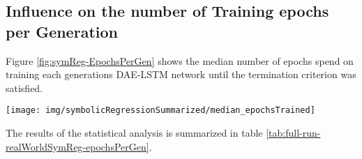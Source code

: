 \documentclass[
  11pt,
]{article}
\let\origfigure\figure
\let\endorigfigure\endfigure
\renewenvironment{figure}[1][2] {
    \expandafter\origfigure\expandafter[H]
} {
    \endorigfigure
}
\begin{document}
\hypertarget{influence-on-the-number-of-training-epochs-per-generation}{%
\subsection{Influence on the number of Training epochs per Generation}\label{influence-on-the-number-of-training-epochs-per-generation}}

Figure \ref{fig:symReg-EpochsPerGen} shows the median number of epochs spend on training each generations DAE-LSTM network until the termination criterion was satisfied.

\begin{figure}[c]

{\centering \texttt{[image: img/symbolicRegressionSummarized/median\_epochsTrained]} 

}

\caption{Training Epochs over 30 Generations - Real World Symbolic Regression}\label{fig:symReg-EpochsPerGen}
\end{figure}

The results of the statistical analysis is summarized in table \ref{tab:full-run-realWorldSymReg-epochsPerGen}.
\end{document}
